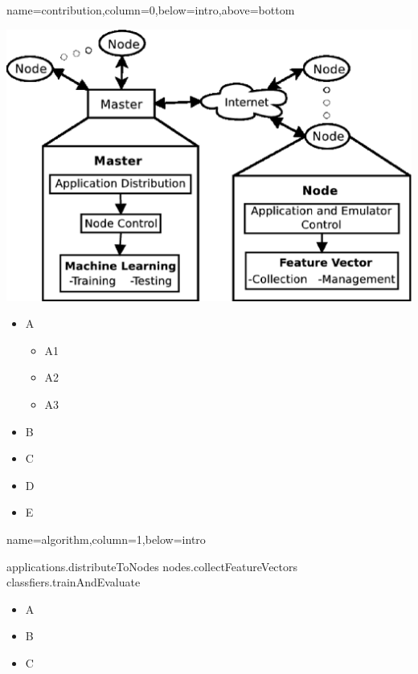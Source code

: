 \documentclass[landscape,specialSize,fontscale=0.3]{./poster/poster}
\begin{document}
\begin{poster}
    {name=contribution,column=0,below=intro,above=bottom}{
  \includegraphics[width=\linewidth]{./poster/stream}
  \begin{itemize}
    \item A
    \begin{itemize}\item A1 \item A2 \item A3\end{itemize}
    \item B \item C \item D \item E
  \end{itemize}
}

    {name=algorithm,column=1,below=intro}{
  \begin{algorithm}[H]
      \dontprintsemicolon
      \linesnumbered
      \nl applications.distributeToNodes \;
      \nl nodes.collectFeatureVectors \;
      \nl classfiers.trainAndEvaluate \;
  \end{algorithm}
  \begin{itemize}\item A \item B \item C\end{itemize}
}


\end{poster}
\end{document}

